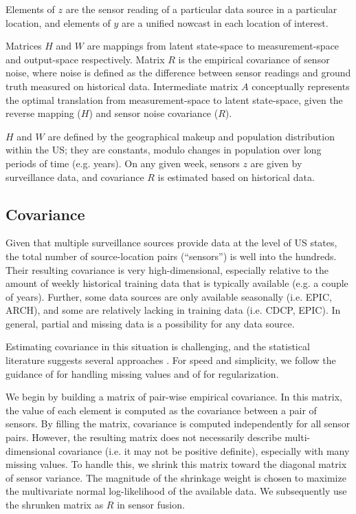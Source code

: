 \documentclass[10pt,letterpaper]{article}
\begin{document}
Elements of $z$ are the sensor reading of a particular data source in a
particular location, and elements of $y$ are a unified nowcast in each location
of interest.

Matrices $H$ and $W$ are mappings from latent state-space to measurement-space
and output-space respectively. Matrix $R$ is the empirical covariance of sensor
noise, where noise is defined as the difference between sensor readings and
ground truth measured on historical data. Intermediate matrix $A$ conceptually
represents the optimal translation from measurement-space to latent
state-space, given the reverse mapping ($H$) and sensor noise covariance ($R$).

$H$ and $W$ are defined by the geographical makeup and population distribution
within the US; they are constants, modulo changes in population over long
periods of time (e.g. years). On any given week, sensors $z$ are given by
surveillance data, and covariance $R$ is estimated based on historical data.

\subsection*{Covariance}

Given that multiple surveillance sources provide data at the level of US
states, the total number of source-location pairs (``sensors'') is well into
the hundreds. Their resulting covariance is very high-dimensional, especially
relative to the amount of weekly historical training data that is typically
available (e.g. a couple of years). Further, some data sources are only
available seasonally (i.e. EPIC, ARCH), and some are relatively lacking in
training data (i.e. CDCP, EPIC). In general, partial and missing data is a
possibility for any data source.

Estimating covariance in this situation is challenging, and the statistical
literature suggests several approaches \cite{bickel2008covariance,
ollerer2015robust, bien2011sparse, friedman2008sparse, bickel2008regularized,
hsieh2011sparse}. For speed and simplicity, we follow the guidance of
\cite{kolar2012consistent} for handling missing values and of
\cite{touloumis2015nonparametric} for regularization.

We begin by building a matrix of pair-wise empirical covariance. In this
matrix, the value of each element is computed as the covariance between a pair
of sensors. By filling the matrix, covariance is computed independently for all
sensor pairs. However, the resulting matrix does not necessarily describe
multi-dimensional covariance (i.e. it may not be positive definite), especially
with many missing values. To handle this, we shrink this matrix toward the
diagonal matrix of sensor variance. The magnitude of the shrinkage weight is
chosen to maximize the multivariate normal log-likelihood of the available
data. We subsequently use the shrunken matrix as $R$ in sensor fusion.
\end{document}
